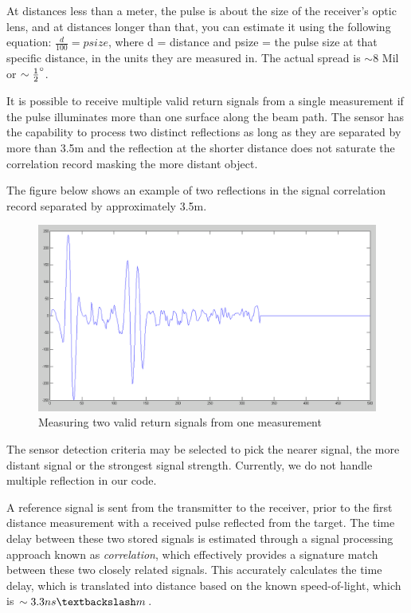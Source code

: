 At distances less than a meter, the pulse is about the size of the receiver's optic lens, and at distances longer than that, you can estimate it using the following equation: $\frac{d}{100} = psize$, where d = distance and psize = the pulse size at that specific distance, in the units they are measured in. The actual spread is $\sim 8$ Mil or $\sim\frac{1}{2}\degree$\cite{spreadofbeam}.

It is possible to receive multiple valid return signals from a single measurement if the pulse illuminates more than one surface along the beam path. The sensor has the capability to process two distinct reflections as long as they are separated by more than 3.5m and the reflection at the shorter distance does not saturate the correlation record masking the more distant object. 

The figure below shows an example of two reflections in the signal correlation record separated by approximately 3.5m.

\begin{figure}[H]
	\centering
	\includegraphics[scale=.3]{images/tworeflection.png}
	\caption{Measuring two valid return signals from one measurement~\cite{howtopulse}}
	\label{fig:tworeflections}
\end{figure}

The sensor detection criteria may be selected to pick the nearer signal, the more distant signal or the strongest signal strength. Currently, we do not handle multiple reflection in our code.

A reference signal is sent from the transmitter to the receiver, prior to the first distance measurement with a received pulse reflected from the target.%
The time delay between these two stored signals is estimated through a signal processing approach known as \textit{correlation}, which effectively provides a signature match between these two closely related signals. This accurately calculates the time delay, which is translated into distance based on the known speed-of-light, which is $\sim3.3ns\textbackslash m$\cite{howtopulse}.

